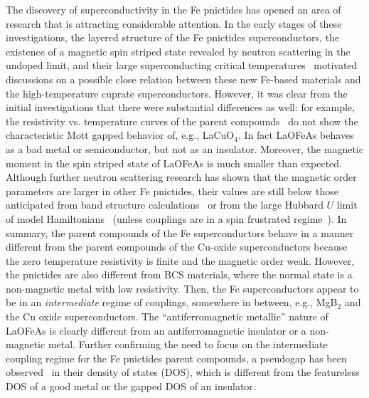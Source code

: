 \documentclass[aps,prb,superscriptaddress,preprintnumbers,
showpacs,legalpaper,twoside,twocolumn,amsmath,amssymb]{revtex4}
\begin{document}
The discovery of superconductivity in the Fe pnictides has opened an area of
research that is attracting considerable attention.\cite{Fe-SC, chen1, chen2, wen, chen3, 55, ren1, ren2}
In the early stages of these investigations, the layered structure of the Fe pnictides
superconductors,\cite{Fe-SC, chen1, chen2, wen, chen3, 55, ren1, ren2}
the existence of a magnetic spin striped state revealed by neutron scattering in the undoped limit,\cite{neutrons1,neutrons2}
and their large superconducting critical temperatures~\cite{Fe-SC, chen1, chen2, wen, chen3, 55, ren1, ren2}
motivated discussions on a possible close relation between these new
Fe-based materials and the high-temperature cuprate superconductors.
However, it was clear from the initial investigations that there were substantial differences as well: for example,
the resistivity vs. temperature curves of the parent compounds~\cite{Fe-SC, chen1, chen2, wen, chen3, 55, ren1, ren2} do not show the characteristic
Mott gapped behavior of, e.g., LaCuO$_4$. In fact LaOFeAs behaves
as a bad metal or semiconductor,\cite{Fe-SC, chen1, chen2, wen, chen3, 55, ren1, ren2} but not as an insulator. Moreover, the magnetic moment in the spin striped
state of LaOFeAs is
much smaller than expected.\cite{neutrons1,neutrons2}
Although further neutron scattering research has shown that the magnetic order parameters
are larger in other Fe pnictides,\cite{neutrons4}
their values are still below those anticipated from
band structure calculations~\cite{singh,first, xu, cao, fang2}
or from the large Hubbard $U$ limit of model Hamiltonians~\cite{daghofer} (unless couplings
are in a  spin frustrated regime~\cite{si}). In summary, the parent compounds of the
Fe superconductors behave in a manner different
from the parent compounds of the Cu-oxide superconductors
because the zero temperature resistivity is finite and the magnetic order weak. However, the pnictides
are also different
from BCS materials, where the normal state is a non-magnetic metal with low resistivity.
Then, the Fe superconductors appear to be
in an {\it intermediate} regime of couplings, somewhere in between, e.g., MgB$_2$ and the Cu oxide
superconductors.\cite{Jaro,basov} The ``antiferromagnetic metallic''
nature of LaOFeAs is clearly different from an
antiferromagnetic insulator or a non-magnetic metal.
Further confirming the need to focus on the intermediate coupling regime for the Fe pnictides parent compounds,
a pseudogap has been observed~\cite{Y.Ishida,T.Sato,liu2,L.Zhao} in their density of states (DOS), which is
different from the featureless DOS of
a good metal or the gapped DOS of an insulator.
\end{document}
